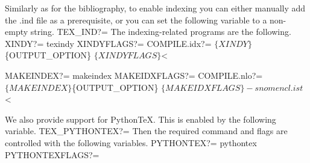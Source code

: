 Similarly as for the bibliography, to enable indexing you can either manually 
add the {\Tt{}.ind\nwendquote} file as a prerequisite, or you can set the following variable 
to a non-empty string.
\nwenddocs{}\plusendmoddef\nwstartdeflinemarkup{}\nwenddeflinemarkup
TEX_IND?=
\nwendcode{}The indexing-related programs are the following.
\nwenddocs{}\plusendmoddef\nwstartdeflinemarkup{}\nwenddeflinemarkup
XINDY?=       texindy
XINDYFLAGS?=
COMPILE.idx?= $\{XINDY\} $\{OUTPUT_OPTION\} $\{XINDYFLAGS\} $<

MAKEINDEX?=   makeindex
MAKEIDXFLAGS?=
COMPILE.nlo?= $\{MAKEINDEX\} $\{OUTPUT_OPTION\} $\{MAKEIDXFLAGS\} -s nomencl.ist $<
\nwendcode{}\nwdocspar

We also provide support for PythonTeX.
This is enabled by the following variable.
\nwenddocs{}\plusendmoddef\nwstartdeflinemarkup{}\nwenddeflinemarkup
TEX_PYTHONTEX?=
\nwendcode{}Then the required command and flags are controlled with the following 
variables.
\nwenddocs{}\plusendmoddef\nwstartdeflinemarkup{}\nwenddeflinemarkup
PYTHONTEX?=   pythontex
PYTHONTEXFLAGS?=
\nwendcode{}\nwdocspar

